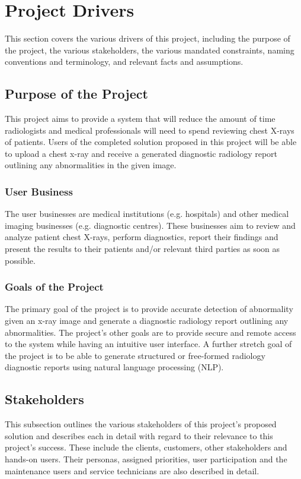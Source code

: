 \documentclass[12pt]{article}
\begin{document}
\section{Project Drivers}
This section covers the various drivers of this project, including the purpose of the project, the various stakeholders, the various mandated constraints, naming conventions and terminology, and relevant facts and assumptions.

\subsection{Purpose of the Project}
This project aims to provide a system that will reduce the amount of time radiologists and medical professionals will need to spend reviewing chest X-rays of patients. Users of the completed solution proposed in this project will be able to upload a chest x-ray and receive a generated diagnostic radiology report outlining any abnormalities in the given image.

\subsubsection{User Business}
The user businesses are medical institutions (e.g. hospitals) and other medical imaging businesses (e.g. diagnostic centres). These businesses aim to review and analyze patient chest X-rays, perform diagnostics, report their findings and present the results to their patients and/or relevant third parties as soon as possible. 

\subsubsection{Goals of the Project}
The primary goal of the project is to provide accurate detection of abnormality given an x-ray image and generate a diagnostic radiology report outlining any abnormalities. The project's other goals are to provide secure and remote access to the system while having an intuitive user interface. A further stretch goal of the project is to be able to generate structured or free-formed radiology diagnostic reports using natural language processing (NLP).

\hypertarget{Users}{\subsection{Stakeholders}}
This subsection outlines the various stakeholders of this project's proposed solution and describes each in detail with regard to their relevance to this project's success. These include the clients, customers, other stakeholders and hands-on users. Their personas, assigned priorities, user participation and the maintenance users and service technicians are also described in detail.
\end{document}
